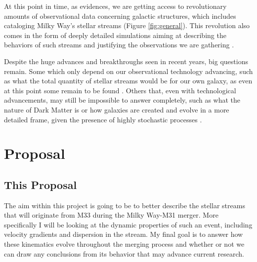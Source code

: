 \documentclass[linenumbers,trackchanges]{aastex7}
\begin{document}
At this point in time, as \cite{Jensen2021-mw} evidences, we are getting access to revolutionary amounts of observational data concerning galactic structures, which includes cataloging Milky Way's stellar streams (Figure \ref{fig:general}). This revolution also comes in the form of deeply detailed simulations aiming at describing the behaviors of such streams and justifying the observations we are gathering \citep{Choi2007-lc}.

\begin{figure*}[ht!]
\caption{Chart demonstrating potential stream stars identified in \citep{Malhan2018-mh}. This evidences the astounding capability we have to identify these objects, however this only accounts for a small portion of all stream stars.}
\label{fig:general}
\end{figure*}

Despite the huge advances and breakthroughs seen in recent years, big questions remain. Some which only depend on our observational technology advancing, such as what the total quantity of stellar streams would be for our own galaxy, as even at this point some remain to be found \citep{Shipp2023-qz}. Others that, even with technological advancements, may still be impossible to answer completely, such as what the nature of Dark Matter is or how galaxies are created and evolve in a more detailed frame, given the presence of highly stochastic processes \citep{Amorisco2017-oc}. 




\section{Proposal} \label{sec:style}

\subsection{This Proposal}

The aim within this project is going to be to better describe the stellar streams that will originate from M33 during the Milky Way-M31 merger. More specifically I will be looking at the dynamic properties of such an event, including velocity gradients and dispersion in the stream. My final goal is to answer how these kinematics evolve throughout the merging process and whether or not we can draw any conclusions from its behavior that may advance current research. 
\end{document}
